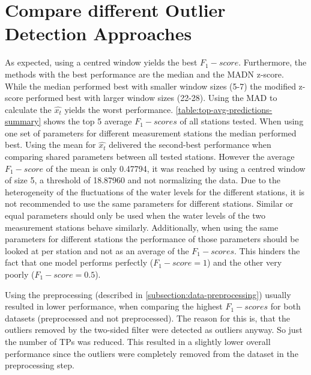 \section{Compare different Outlier Detection Approaches}
As expected, using a centred window yields the best $F_1-score$. Furthermore, the methods with the best performance are the median and the \ac{MADN} z-score. While the median performed best with smaller window sizes (5-7) the modified z-score performed best with larger window sizes (22-28). Using the \ac{MAD} to calculate the $\hat{x_t}$ yields the worst performance.
\newline
\autoref{table:top-avg-predictions-summary} shows the top 5 average $F_1-scores$ of all stations tested. When using one set of parameters for different measurement stations the median performed best. Using the mean for $\hat{x_t}$ delivered the second-best performance when comparing shared parameters between all tested stations. However the average $F_1-score$ of the mean is only 0.47794, it was reached by using a centred window of size 5, a threshold of 18.87960 and not normalizing the data. Due to the heterogeneity of the fluctuations of the water levels for the different stations, it is not recommended to use the same parameters for different stations. Similar or equal parameters should only be used when the water levels of the two measurement stations behave similarly. Additionally, when using the same parameters for different stations the performance of those parameters should be looked at per station and not as an average of the  $F_1-scores$. This hinders the fact that one model performs perfectly ($F_1-score = 1$) and the other very poorly ($F_1-score = 0.5$). 

\newline
Using the preprocessing (described in \autoref{subsection:data-preprocessing}) usually resulted in lower performance, when comparing the highest $F_1-scores$ for both datasets (preprocessed and not preprocessed). The reason for this is, that the outliers removed by the two-sided filter were detected as outliers anyway. So just the number of \acp{TP} was reduced. This resulted in a slightly lower overall performance since the outliers were completely removed from the dataset in the preprocessing step.
\clearpage
